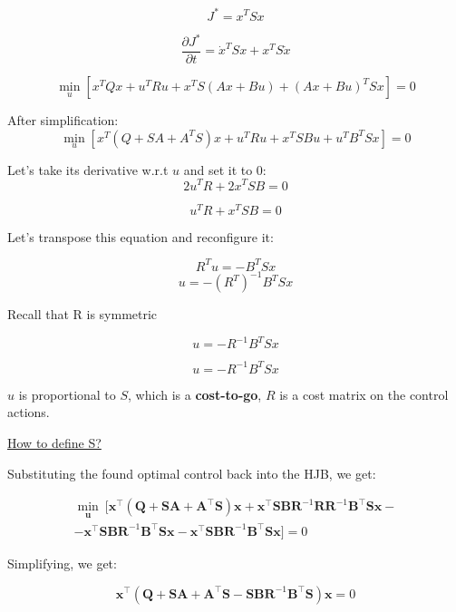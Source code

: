 \[J^* = x^T S x\]

\[\dfrac{\partial J^*}{\partial t} = \dot x^T S x + x^ T S \dot x\]

\[\min_u [x^TQx + u^TRu + x^TS(Ax+Bu) +(Ax+Bu)^TSx] = 0\]

After simplification:
\[\min_u [x^T (Q + SA + A^TS)x + u^TRu + x^TSBu + u^TB^TSx] = 0\]

Let's take its derivative w.r.t $u$ and set it to 0:
\[2u^TR + 2x^TSB = 0\]

\[u^TR + x^TSB = 0\]

Let's transpose this equation and reconfigure it:

\[R^T u =-B^TSx\]
\[u = -(R^T)^{-1}B^TSx\]

Recall that R is symmetric

\[u = -R^{-1}B^TSx\]

\begin{tcolorbox}
    \[ u = -R^{-1}B^T Sx \]
\end{tcolorbox}

$u$ is proportional to $S$, which is a \textbf{cost-to-go}, $R$ is a cost matrix on the control actions. 

\underline{How to define S?}

Substituting the found optimal control back into the HJB, we get:

\begin{equation}
    \begin{split}
    \underset{\mathbf{u}}{\min} \ 
    [ 
    \mathbf{x}^\top (
    \mathbf{Q} + \mathbf{S} \mathbf{A} + \mathbf{A}^\top \mathbf{S}
    )\mathbf{x}
    +
    \mathbf{x}^\top \mathbf{S} \mathbf{B} \mathbf{R}^{-1} \mathbf{R} \mathbf{R}^{-1} \mathbf{B}^\top \mathbf{S} \mathbf{x}
    - \\
    - 
    \mathbf{x}^\top \mathbf{S} \mathbf{B} \mathbf{R}^{-1} \mathbf{B}^\top \mathbf{S} \mathbf{x}
    - 
    \mathbf{x}^\top\mathbf{S} \mathbf{B} \mathbf{R}^{-1} \mathbf{B}^\top \mathbf{S} \mathbf{x} 
    ] = 0
    \end{split}
\end{equation}

Simplifying, we get: 

\begin{equation}
    \mathbf{x}^\top (\mathbf{Q} + \mathbf{S} \mathbf{A} + \mathbf{A}^\top \mathbf{S}
    - \mathbf{S} \mathbf{B} \mathbf{R}^{-1} \mathbf{B}^\top \mathbf{S}) \mathbf{x} = 0
\end{equation}

